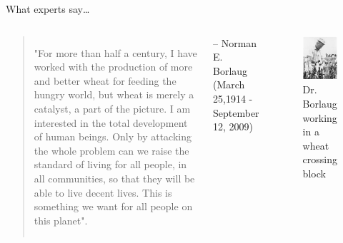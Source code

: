 \documentclass[11pt,ignorenonframetext,aspectratio=169]{beamer}
\newcommand{\bcolumns}{\begin{columns}[T, onlytextwidth]}
\newcommand{\ecolumns}{\end{columns}}
\begin{document}
\begin{frame}{What experts say\ldots{}}
\protect\hypertarget{what-experts-say}{}
\bcolumns
{}

\begin{quote}
\small
"For more than half a century, I have worked with the production of more and better wheat for feeding the hungry world, but wheat is merely a catalyst, a part of the picture. I am interested in the total development of human beings. Only by attacking the whole problem can we raise the standard of living for all people, in all communities, so that they will be able to live decent lives. This is something we want for all people on this planet".
\end{quote}
\hfill\raggedright{\footnotesize -- Norman E. Borlaug (March 25,1914 - September 12, 2009)}


\begin{figure}
\includegraphics[width=0.95\linewidth]{./images/borlaug_wheat_crossing_block} \caption{Dr. Borlaug working in a wheat crossing block}\label{fig:borlaug}
\end{figure}

\ecolumns
\end{frame}
\end{document}

